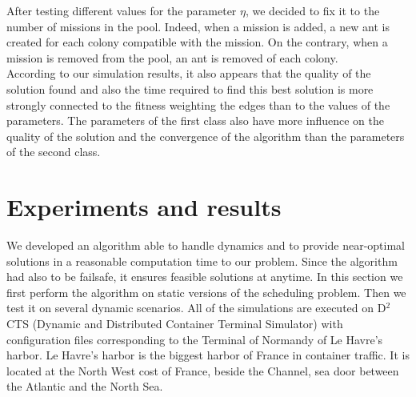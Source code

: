\documentclass[a4paper,12pt]{article}
\begin{document}
After testing different values for the parameter $\eta$, we decided to fix it to the number of missions in the pool. Indeed, when a mission is added, a new ant is created for each colony compatible with the mission. On the contrary, when a mission is removed from the pool, an ant is removed of each colony.\\

According to our simulation results, it also appears that the quality of the solution found and also the time required to find this best solution is more strongly connected to the fitness weighting the edges than to the values of the parameters. The parameters of the first class also have more influence on the quality of the solution and the convergence of the algorithm than the parameters of the second class.

\section{Experiments and results}\label{sec:expe}
   We developed an algorithm able to handle dynamics and to provide near-optimal solutions in a reasonable computation time to our problem. Since the algorithm had also to be failsafe, it ensures feasible solutions at anytime. In this section we first perform the algorithm on static versions of the scheduling problem. Then we test it on several dynamic scenarios.
   All of the simulations are executed on D$^2$CTS (Dynamic and Distributed Container Terminal Simulator)\cite{Lesauvage2011} with configuration files corresponding to the Terminal of Normandy of Le Havre's harbor. Le Havre’s harbor is the biggest harbor of France in container traffic. It is located at the North West cost of France, beside the Channel, sea door between the Atlantic and the North Sea.

\end{document}
